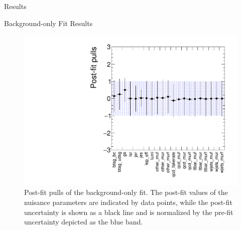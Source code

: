 \begin{section}{Results}
\begin{subsection}{Background-only Fit Results}
\begin{figure}[tbp!]
\centering
\includegraphics[angle=0,width=0.80\columnwidth]{fig/bonly_pulls.pdf}
\caption{Post-fit pulls of the background-only fit.
The post-fit values of the nuisance parameters are indicated by data points, while the post-fit uncertainty is shown as a black line and is normalized by the pre-fit uncertainty depicted as the blue band.}
\label{fig:bonly_pulls}
\end{figure}


\end{subsection}
\end{section}
